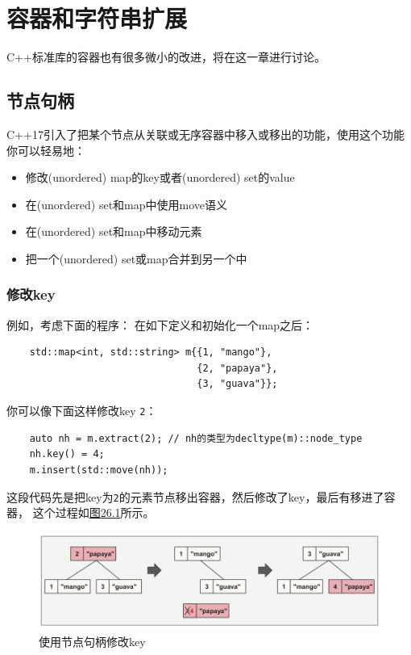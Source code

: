 \chapter{容器和字符串扩展}\label{ch26}
C++标准库的容器也有很多微小的改进，将在这一章进行讨论。


\section{节点句柄}
C++17引入了把某个节点从关联或无序容器中移入或移出的功能，使用这个功能你可以轻易地：
\begin{itemize}
    \item 修改(unordered) map的key或者(unordered) set的value
    \item 在(unordered) set和map中使用move语义
    \item 在(unordered) set和map中移动元素
    \item 把一个(unordered) set或map合并到另一个中
\end{itemize}

\subsection{修改key}
例如，考虑下面的程序：
在如下定义和初始化一个map之后：
\begin{lstlisting}
    std::map<int, std::string> m{{1, "mango"},
                                 {2, "papaya"},
                                 {3, "guava"}};
\end{lstlisting}
你可以像下面这样修改key \texttt{2}：
\begin{lstlisting}
    auto nh = m.extract(2); // nh的类型为decltype(m)::node_type
    nh.key() = 4;
    m.insert(std::move(nh));
\end{lstlisting}
这段代码先是把key为\texttt{2}的元素节点移出容器，然后修改了key，最后有移进了容器，
这个过程如\hyperref[f26.1]{图26.1}所示。
\begin{figure}[ht]
    \centering
    \includegraphics[scale=0.67]{../imgs/26.1.png}
    \caption{使用节点句柄修改key}
    \label{f26.1}
\end{figure}


